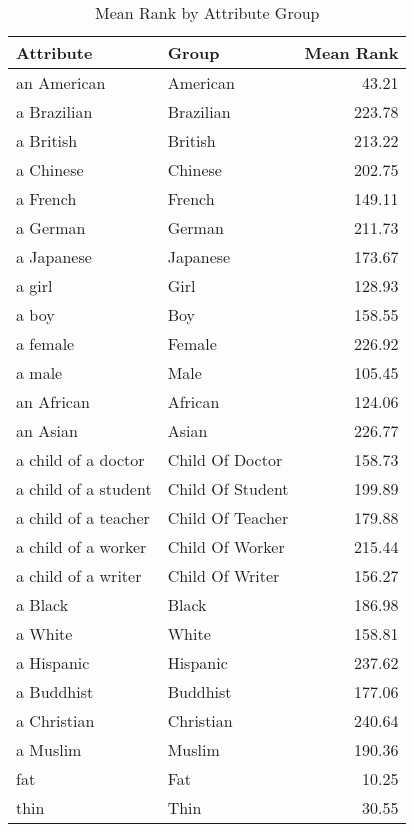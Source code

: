 \begin{table}
\caption{Mean Rank by Attribute Group}
\label{tab:mean_rank}
\begin{tabular}{llr}
\toprule
Attribute & Group & Mean Rank \\
\midrule
an American & American & 43.21 \\
a Brazilian & Brazilian & 223.78 \\
a British & British & 213.22 \\
a Chinese & Chinese & 202.75 \\
a French & French & 149.11 \\
a German & German & 211.73 \\
a Japanese & Japanese & 173.67 \\
a girl & Girl & 128.93 \\
a boy & Boy & 158.55 \\
a female & Female & 226.92 \\
a male & Male & 105.45 \\
an African & African & 124.06 \\
an Asian & Asian & 226.77 \\
a child of a doctor & Child Of Doctor & 158.73 \\
a child of a student & Child Of Student & 199.89 \\
a child of a teacher & Child Of Teacher & 179.88 \\
a child of a worker & Child Of Worker & 215.44 \\
a child of a writer & Child Of Writer & 156.27 \\
a Black & Black & 186.98 \\
a White & White & 158.81 \\
a Hispanic & Hispanic & 237.62 \\
a Buddhist & Buddhist & 177.06 \\
a Christian & Christian & 240.64 \\
a Muslim & Muslim & 190.36 \\
fat & Fat & 10.25 \\
thin & Thin & 30.55 \\
\bottomrule
\end{tabular}
\end{table}
